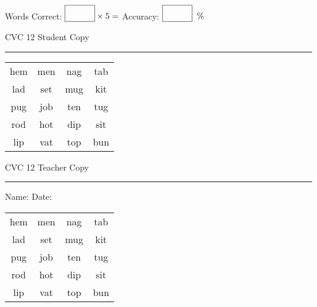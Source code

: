 \documentclass{memoir}
\begin{document}
\small

Words Correct: $\fbox{\phantom{\huge 100}} \times 5 = $ Accuracy: $\fbox{\phantom{\huge 100}}\;\; \%$ 

\vfill

\newpage


\footnotesize \noindent
CVC 12 \hfill Student Copy
\smallskip
\hrule

\Large

\setlength{\tabcolsep}{14pt}
\def\arraystretch{2}

{\selectfont


\begin{vplace}[0.5]
\begin{center}
\begin{tabular}{cccc}
hem & men & nag & tab \\
lad & set & mug & kit \\
pug & job & ten & tug \\
rod & hot & dip & sit \\
lip & vat & top & bun \\
\end{tabular}
\end{center}
\end{vplace}

}

\newpage

\footnotesize \noindent
CVC 12 \hfill Teacher Copy
\smallskip
\hrule

\small

\vfill

\noindent
Name: \underline{\hspace{1.75in}} \hfill Date: \underline{\hspace{1in}}

\Large

{\selectfont


\begin{vplace}[0.5]
\begin{center}
\begin{tabular}{cccc}
hem & men & nag & tab \\
lad & set & mug & kit \\
pug & job & ten & tug \\
rod & hot & dip & sit \\
lip & vat & top & bun \\
\end{tabular}
\end{center}
\end{vplace}



}
\end{document}
